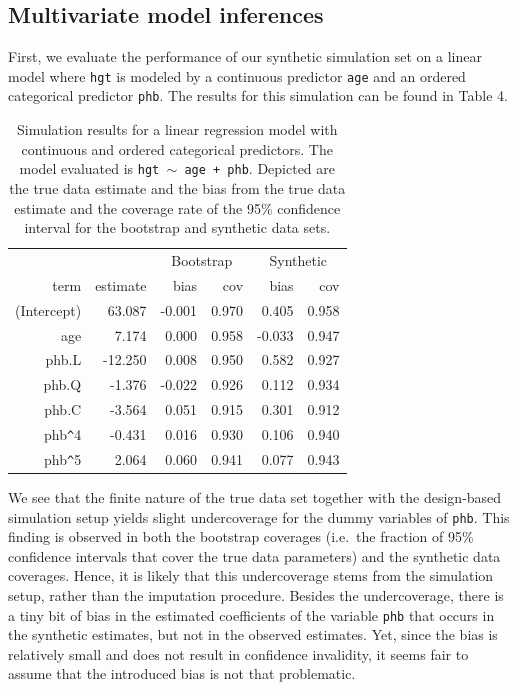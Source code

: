 \documentclass[psych,article,submit,moreauthors,pdftex]{mdpi}
\begin{document}
\hypertarget{multivariate-model-inferences}{%
\subsection{Multivariate model
inferences}\label{multivariate-model-inferences}}

First, we evaluate the performance of our synthetic simulation set on a
linear model where \texttt{hgt} is modeled by a continuous predictor
\texttt{age} and an ordered categorical predictor \texttt{phb}. The
results for this simulation can be found in Table 4.

\begin{table}[ht]
\caption{Simulation results for a linear regression model with continuous and ordered categorical predictors. The model evaluated is \texttt{hgt $\sim$ age + phb}. Depicted are the true data estimate and the bias from the true data estimate and the coverage rate of the 95\% confidence interval for the bootstrap and synthetic data sets.}
\centering
\begin{tabular}{rrrrrr}
  \hline
  & & \multicolumn{2}{c}{Bootstrap} & \multicolumn{2}{c}{Synthetic}\\
 term & estimate & bias & cov & bias & cov \\ 
  \hline
(Intercept) & 63.087 & -0.001 & 0.970 & 0.405 & 0.958 \\ 
  age & 7.174 & 0.000 & 0.958 & -0.033 & 0.947 \\ 
  phb.L & -12.250 & 0.008 & 0.950 & 0.582 & 0.927 \\ 
  phb.Q & -1.376 & -0.022 & 0.926 & 0.112 & 0.934 \\ 
  phb.C & -3.564 & 0.051 & 0.915 & 0.301 & 0.912 \\ 
  phb\verb|^|4 & -0.431 & 0.016 & 0.930 & 0.106 & 0.940 \\ 
  phb\verb|^|5 & 2.064 & 0.060 & 0.941 & 0.077 & 0.943 \\ 
   \hline
\end{tabular}
\end{table}

We see that the finite nature of the true data set together with the
design-based simulation setup yields slight undercoverage for the dummy
variables of \texttt{phb}. This finding is observed in both the
bootstrap coverages (i.e.~the fraction of 95\% confidence intervals that
cover the true data parameters) and the synthetic data coverages. Hence,
it is likely that this undercoverage stems from the simulation setup,
rather than the imputation procedure. Besides the undercoverage, there
is a tiny bit of bias in the estimated coefficients of the variable
\texttt{phb} that occurs in the synthetic estimates, but not in the
observed estimates. Yet, since the bias is relatively small and does not
result in confidence invalidity, it seems fair to assume that the
introduced bias is not that problematic.
\end{document}

